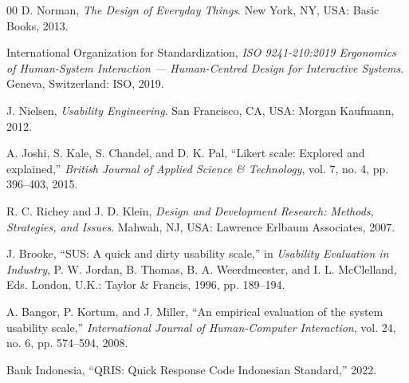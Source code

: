 \documentclass[conference]{IEEEtran}
\begin{document}
\begin{thebibliography}{00}
 D. Norman, \textit{The Design of Everyday Things}. New York, NY, USA: Basic Books, 2013.

 International Organization for Standardization, \textit{ISO 9241-210:2019 Ergonomics of Human-System Interaction — Human-Centred Design for Interactive Systems}. Geneva, Switzerland: ISO, 2019.

 J. Nielsen, \textit{Usability Engineering}. San Francisco, CA, USA: Morgan Kaufmann, 2012.

 A. Joshi, S. Kale, S. Chandel, and D. K. Pal, “Likert scale: Explored and explained,” \textit{British Journal of Applied Science \& Technology}, vol. 7, no. 4, pp. 396--403, 2015.

 R. C. Richey and J. D. Klein, \textit{Design and Development Research: Methods, Strategies, and Issues}. Mahwah, NJ, USA: Lawrence Erlbaum Associates, 2007.

 J. Brooke, “SUS: A quick and dirty usability scale,” in \textit{Usability Evaluation in Industry}, P. W. Jordan, B. Thomas, B. A. Weerdmeester, and I. L. McClelland, Eds. London, U.K.: Taylor \& Francis, 1996, pp. 189--194.

 A. Bangor, P. Kortum, and J. Miller, “An empirical evaluation of the system usability scale,” \textit{International Journal of Human-Computer Interaction}, vol. 24, no. 6, pp. 574--594, 2008.

 Bank Indonesia, “QRIS: Quick Response Code Indonesian Standard,” 2022.
\end{thebibliography}
\end{document}
